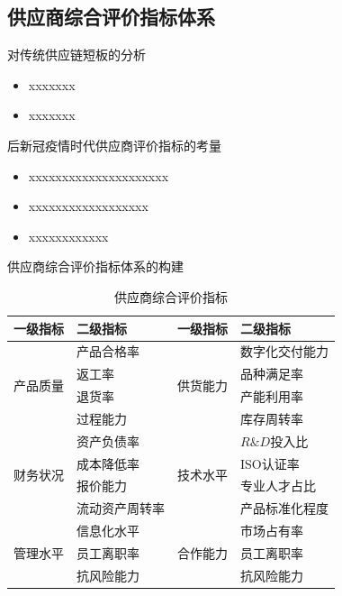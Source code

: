 \documentclass{beamer}
\begin{document}
\subsection{供应商综合评价指标体系}
\begin{frame}
	
	\begin{block}{对传统供应链短板的分析}
	\begin{itemize}
		\item xxxxxxx
		\item xxxxxxx
	\end{itemize}
\end{block}

\begin{block}{后新冠疫情时代供应商评价指标的考量}
		\begin{itemize}
		\item xxxxxxxxxxxxxxxxxxxxx
		\item xxxxxxxxxxxxxxxxxx
		\item xxxxxxxxxxxx
	\end{itemize}
	\end{block}

\end{frame}

\begin{frame}{供应商综合评价指标体系的构建}
\vspace{-3mm}
\renewcommand{\arraystretch}{1.5}	
\begin{table}[h]  
	\scriptsize
	\centering
	\caption{供应商综合评价指标}   
	\label{体系}
	\begin{tabular}{p{2cm}lp{2cm}l}    
		\toprule    
		一级指标&二级指标&一级指标&二级指标\\
		\midrule   
		\multirow{4}{3cm}{产品质量}&产品合格率&\multirow{4}{3cm}{供货能力}&数字化交付能力\\
		&返工率&&品种满足率\\
		&退货率 &&产能利用率\\
		&过程能力 &&库存周转率\\
		\cline{1-4}  
		\multirow{4}{3cm}{财务状况}& 资产负债率&\multirow{4}{3cm}{技术水平}&$R\& D$投入比\\
		&成本降低率&&ISO认证率 \\
		&报价能力&&专业人才占比\\
		&流动资产周转率&&产品标准化程度\\
		\cline{1-4}
		\multirow{4}{3cm}{管理水平}  &信息化水平&\multirow{4}{3cm}{合作能力}  &市场占有率\\
		&员工离职率&&员工离职率\\\
		&抗风险能力&&抗风险能力 \\
		\bottomrule   
	\end{tabular}  
\end{table}

\end{frame}
\end{document}

